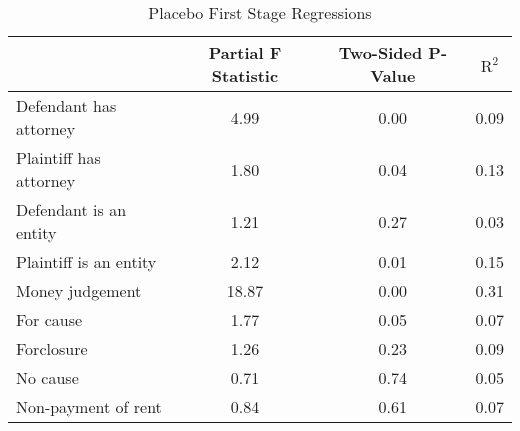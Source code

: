 \begin{table}[htbp]\centering
\caption{Placebo First Stage Regressions}
\begin{tabular}{l*{3}{c}}
\toprule
                    &Partial F Statistic&Two-Sided P-Value&         $\text{R}^2$\\
\midrule
Defendant has attorney&        4.99&        0.00&        0.09\\
Plaintiff has attorney&        1.80&        0.04&        0.13\\
Defendant is an entity&        1.21&        0.27&        0.03\\
Plaintiff is an entity&        2.12&        0.01&        0.15\\
Money judgement     &       18.87&        0.00&        0.31\\
For cause           &        1.77&        0.05&        0.07\\
Forclosure          &        1.26&        0.23&        0.09\\
No cause            &        0.71&        0.74&        0.05\\
Non-payment of rent &        0.84&        0.61&        0.07\\
\bottomrule
\end{tabular}
\end{table}
